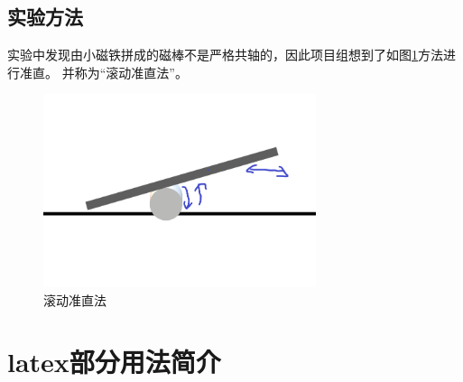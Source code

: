 \documentclass[AutoFakeBold]{LZUThesis}
\begin{document}
\section{实验方法}
实验中发现由小磁铁拼成的磁棒不是严格共轴的，因此项目组想到了如图\ref{a_way}方法进行准直。
并称为“滚动准直法”。
\begin{figure}[H]
    \centering
    \includegraphics[width=8cm]{figures/a_way.png}
    \caption{滚动准直法}
    \label{a_way}
\end{figure}





























































\chapter{latex部分用法简介}
\end{document}
